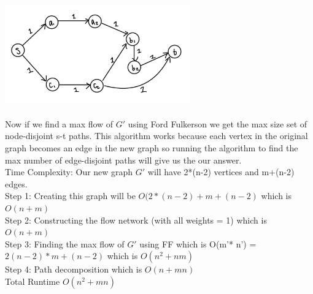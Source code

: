 \documentclass[12pt]{article}
\begin{document}
    \includegraphics[width=8cm]{Graphs/3B.jpg}
    \\\\
    Now if we find a max flow of $G'$ using Ford Fulkerson we get the max size set of node-disjoint s-t paths. 
    This algorithm works because each vertex in the original graph becomes an edge in the new graph so running the algorithm to find the max number of edge-disjoint paths will give us the our answer.
    \\
    Time Complexity: Our new graph $G'$ will have 2*(n-2) vertices and m+(n-2) edges. \\ Step 1: Creating this graph will be $O(2*(n-2) + m+(n-2)$ which is $O(n + m)$ \\
    Step 2: Constructing the flow network (with all weights = 1) which is $O(n + m)$\\
    Step 3: Finding the max flow of $G'$ using FF which is O(m'* n') = $2(n-2) * m+(n-2)$ which is $O(n^2 + nm)$\\
    Step 4: Path decomposition which is $O(n + mn)$\\
    
    Total Runtime $O(n^2 + mn)$
\end{document}
